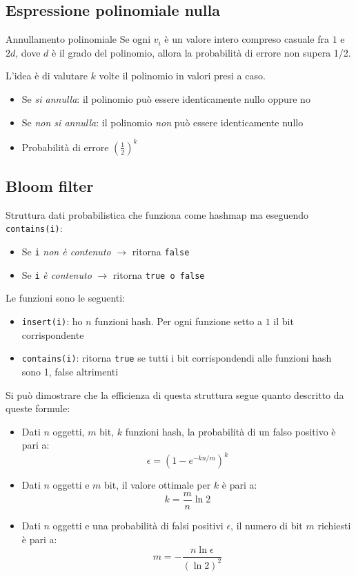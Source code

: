 \subsection{Espressione polinomiale nulla}
\begin{teorema}{Annullamento polinomiale}
	Se ogni $ v_i $ è un valore intero compreso casuale fra $ 1 $ e $ 2d $, dove $ d $ è il grado del polinomio, allora la probabilità di errore non supera 1/2.
\end{teorema}

L'idea è di valutare $ k $ volte il polinomio in valori presi a caso.
\begin{itemize}
	\item Se \textit{si annulla}: il polinomio può essere identicamente nullo oppure no
	\item Se \textit{non si annulla}: il polinomio \textit{non} può essere identicamente nullo
	\item Probabilità di errore $ \left(\frac{1}{2}\right)^{k} $
\end{itemize}
\subsection{Bloom filter}
Struttura dati probabilistica che funziona come hashmap ma eseguendo \verb|contains(i)|:
\begin{itemize}
	\item Se \verb|i| \textit{non è contenuto} $ \rightarrow  $ ritorna \verb|false|
	\item Se \verb|i|  \textit{è contenuto} $ \rightarrow  $ ritorna \verb|true o false|
\end{itemize}
Le funzioni sono le seguenti:
\begin{itemize}
	\item \verb|insert(i)|: ho $ n $ funzioni hash. Per ogni funzione setto a $ 1 $ il bit corrispondente
	\item \verb|contains(i)|: ritorna \verb|true| se tutti i bit corrispondendi alle funzioni hash sono 1, false altrimenti
\end{itemize}
Si può dimostrare che la efficienza di questa struttura segue quanto descritto da queste formule:
\begin{itemize}
	\item Dati $n$ oggetti, $m$ bit, $k$ funzioni hash, la probabilità di un falso positivo è pari a:
	      \[
		      \epsilon = \left( 1 - e^{-kn/m} \right)^k
	      \]

	\item Dati $n$ oggetti e $m$ bit, il valore ottimale per $k$ è pari a:
	      \[
		      k = \frac{m}{n} \ln 2
	      \]

	\item Dati $n$ oggetti e una probabilità di falsi positivi $\epsilon$, il numero di bit $m$ richiesti è pari a:
	      \[
		      m = -\frac{n \ln \epsilon}{(\ln 2)^2}
	      \]
\end{itemize}


